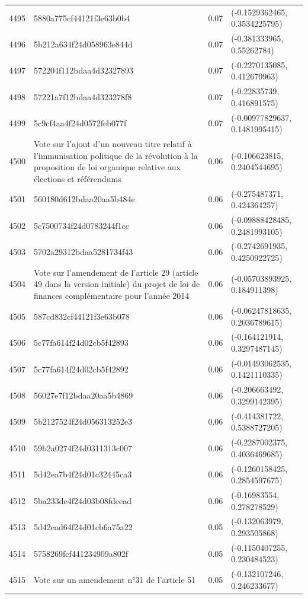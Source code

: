 \begin{table}[ht]
\begin{tabular}{rlrl}
  4495 & 5880a775cf44121f3e63b0b4 & 0.07 & (-0.1529362465, 0.3534225795) \\ 
  4496 & 5b212a634f24d058963e844d & 0.07 & (-0.381333965, 0.55262784) \\ 
  4497 & 572204f112bdaa4d32327893 & 0.07 & (-0.2270135085, 0.412670963) \\ 
  4498 & 57221a7f12bdaa4d323278f8 & 0.07 & (-0.22835739, 0.416891575) \\ 
  4499 & 5c9cf4aa4f24d0572feb077f & 0.07 & (-0.00977829637, 0.1481995415) \\ 
  4500 & Vote sur l'ajout d'un nouveau titre relatif à l'immunisation politique de la révolution à la proposition de loi organique relative aux élections et référendums & 0.06 & (-0.106623815, 0.2404544695) \\ 
  4501 & 560180d612bdaa20aa5b484e & 0.06 & (-0.275487371, 0.424364257) \\ 
  4502 & 5c7500734f24d0783244f1cc & 0.06 & (-0.09888428485, 0.2481993105) \\ 
  4503 & 5702a29312bdaa5281734f43 & 0.06 & (-0.2742691935, 0.4250922725) \\ 
  4504 & Vote sur l'amendement de l'article 29 (article 49 dans la version initiale) du projet de loi de finances complémentaire pour l'année 2014 & 0.06 & (-0.05703893925, 0.184911398) \\ 
  4505 & 587cd832cf44121f3e63b078 & 0.06 & (-0.06247818635, 0.2036789615) \\ 
  4506 & 5c77fa614f24d02cb5f42893 & 0.06 & (-0.164121914, 0.3297487145) \\ 
  4507 & 5c77fa614f24d02cb5f42892 & 0.06 & (-0.01493062535, 0.1421110335) \\ 
  4508 & 56027e7f12bdaa20aa5b4869 & 0.06 & (-0.206663492, 0.3299142395) \\ 
  4509 & 5b2127524f24d056313252e3 & 0.06 & (-0.414381722, 0.5388727205) \\ 
  4510 & 59b2a0274f24d0311313c007 & 0.06 & (-0.2287002375, 0.4036469685) \\ 
  4511 & 5d42ea7b4f24d01c32445ca3 & 0.06 & (-0.1260158425, 0.2854597675) \\ 
  4512 & 5ba233de4f24d03b08fdeead & 0.06 & (-0.16983554, 0.278278529) \\ 
  4513 & 5d42ead64f24d01cb6a75a22 & 0.05 & (-0.132063979, 0.293505868) \\ 
  4514 & 5758269fcf441234909a802f & 0.05 & (-0.1150407255, 0.230484523) \\ 
  4515 & Vote sur un amendement n°31 de l'article 51 & 0.05 & (-0.132107246, 0.246233677) \\ 

\end{tabular}
\end{table}

